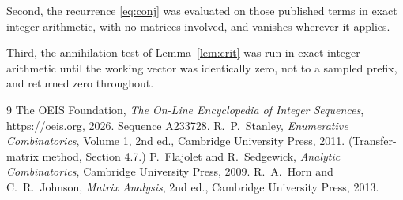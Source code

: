 \documentclass[11pt,a4paper]{article}
\theoremstyle{plain}
\theoremstyle{definition}
\begin{document}
Second, the recurrence \eqref{eq:conj} was evaluated on those published terms in exact
integer arithmetic, with no matrices involved, and vanishes wherever it applies.

Third, the annihilation test of Lemma~\ref{lem:crit} was run in exact integer arithmetic
until the working vector was identically zero, not to a sampled prefix, and returned zero
throughout.

\begin{thebibliography}{9}
 The OEIS Foundation, \emph{The On-Line Encyclopedia of Integer
Sequences}, \url{https://oeis.org}, 2026. Sequence A233728.
 R.~P.~Stanley, \emph{Enumerative Combinatorics}, Volume 1, 2nd ed.,
Cambridge University Press, 2011. (Transfer-matrix method, Section 4.7.)
 P.~Flajolet and R.~Sedgewick, \emph{Analytic Combinatorics}, Cambridge
University Press, 2009.
 R.~A.~Horn and C.~R.~Johnson, \emph{Matrix Analysis}, 2nd ed., Cambridge
University Press, 2013.
\end{thebibliography}
\end{document}
